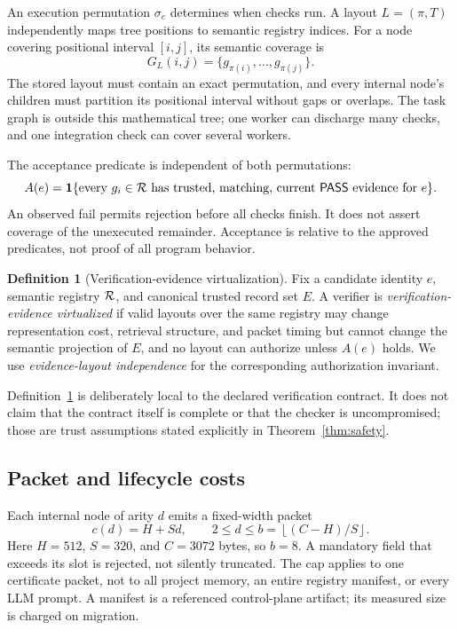 \documentclass[11pt]{article}
\theoremstyle{definition}\newtheorem{definition}[theorem]{Definition}
\newcommand{\PASS}{\mathsf{PASS}}\newcommand{\FAIL}{\mathsf{FAIL}}\newcommand{\UNKNOWN}{\mathsf{UNKNOWN}}
\begin{document}
An execution permutation $\sigma_e$ determines when checks run. A layout $L=(\pi,T)$ independently maps tree positions to semantic registry indices. For a node covering positional interval $[i,j]$, its semantic coverage is
\begin{equation}
 G_L(i,j)=\{g_{\pi(i)},\ldots,g_{\pi(j)}\}.
\end{equation}
The stored layout must contain an exact permutation, and every internal node's children must partition its positional interval without gaps or overlaps. The task graph is outside this mathematical tree; one worker can discharge many checks, and one integration check can cover several workers.

The acceptance predicate is independent of both permutations:
\begin{equation}\label{eq:accept}
 A(e)=\ind\{\text{every }g_i\in\R\text{ has trusted, matching, current }\PASS\text{ evidence for }e\}.
\end{equation}
An observed fail permits rejection before all checks finish. It does not assert coverage of the unexecuted remainder. Acceptance is relative to the approved predicates, not proof of all program behavior.

\begin{definition}[Verification-evidence virtualization]\label{def:eli}
Fix a candidate identity $e$, semantic registry $\mathcal R$, and canonical trusted record set $E$. A verifier is \emph{verification-evidence virtualized} if valid layouts over the same registry may change representation cost, retrieval structure, and packet timing but cannot change the semantic projection of $E$, and no layout can authorize unless $A(e)$ holds. We use \emph{evidence-layout independence} for the corresponding authorization invariant.
\end{definition}
Definition~\ref{def:eli} is deliberately local to the declared verification contract. It does not claim that the contract itself is complete or that the checker is uncompromised; those are trust assumptions stated explicitly in Theorem~\ref{thm:safety}.

\subsection{Packet and lifecycle costs}
Each internal node of arity $d$ emits a fixed-width packet
\begin{equation}\label{eq:packet}
 c(d)=H+Sd,\qquad 2\le d\le b=\left\lfloor(C-H)/S\right\rfloor.
\end{equation}
Here $H=512$, $S=320$, and $C=3072$ bytes, so $b=8$. A mandatory field that exceeds its slot is rejected, not silently truncated. The cap applies to one certificate packet, not to all project memory, an entire registry manifest, or every LLM prompt. A manifest is a referenced control-plane artifact; its measured size is charged on migration.
\end{document}
